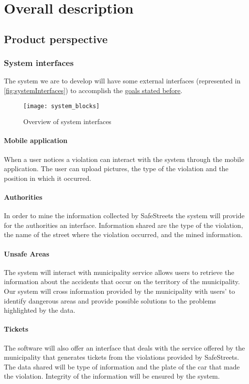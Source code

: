 \section{Overall description}
\subsection{Product perspective}
	\subsubsection{System interfaces}
	\label{sec:systemInterfaces}
		The system we are to develop will have some external interfaces (represented in \autoref{fig:systemInterfaces}) to accomplish the \hyperref[sec:goals]{goals stated before}.
		\begin{figure}[h]
			\centering
			\texttt{[image: system\_blocks]}
			\caption{
				\label{fig:systemInterfaces} 
				Overview of system interfaces
			}
		\end{figure}
	\paragraph{Mobile application}
	When a user notices a violation can interact with the system  through the mobile application. The user can upload pictures, the type of the violation and the position in which it occurred.
	
	\paragraph{Authorities} In order to mine the information collected by SafeStreets the system will provide for the authorities an interface. Information shared are the type of the violation, the name of the street where the violation occurred, and the mined information.

	\paragraph{Unsafe Areas} The system will interact with municipality service allows users to retrieve the information about the accidents that occur on the territory of the municipality. Our system will cross information provided by the municipality with users' to identify dangerous areas and provide possible solutions to the problems highlighted by the data. 
	
	\paragraph{Tickets} The software will also offer an interface that deals with the service offered by the municipality that generates tickets from the violations provided by SafeStreets. The data shared will be type of information and the plate of the car that made the violation. Integrity of the information will be ensured by the system.
	
